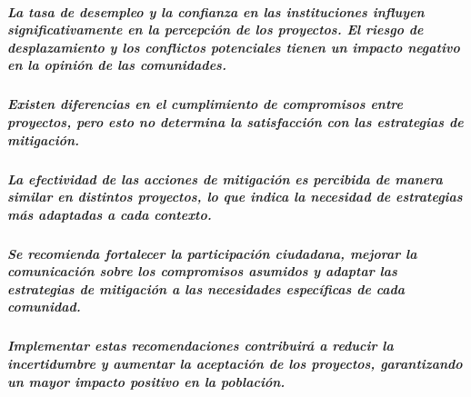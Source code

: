 \documentclass[
]{article}
\begin{document}
\subparagraph{\texorpdfstring{\emph{La tasa de desempleo y la confianza
en las instituciones influyen significativamente en la percepción de los
proyectos. El riesgo de desplazamiento y los conflictos potenciales
tienen un impacto negativo en la opinión de las
comunidades.}}{La tasa de desempleo y la confianza en las instituciones influyen significativamente en la percepción de los proyectos. El riesgo de desplazamiento y los conflictos potenciales tienen un impacto negativo en la opinión de las comunidades.}}\label{la-tasa-de-desempleo-y-la-confianza-en-las-instituciones-influyen-significativamente-en-la-percepciuxf3n-de-los-proyectos.-el-riesgo-de-desplazamiento-y-los-conflictos-potenciales-tienen-un-impacto-negativo-en-la-opiniuxf3n-de-las-comunidades.}

\subparagraph{\texorpdfstring{\emph{Existen diferencias en el
cumplimiento de compromisos entre proyectos, pero esto no determina la
satisfacción con las estrategias de
mitigación.}}{Existen diferencias en el cumplimiento de compromisos entre proyectos, pero esto no determina la satisfacción con las estrategias de mitigación.}}\label{existen-diferencias-en-el-cumplimiento-de-compromisos-entre-proyectos-pero-esto-no-determina-la-satisfacciuxf3n-con-las-estrategias-de-mitigaciuxf3n.}

\subparagraph{\texorpdfstring{\emph{La efectividad de las acciones de
mitigación es percibida de manera similar en distintos proyectos, lo que
indica la necesidad de estrategias más adaptadas a cada
contexto.}}{La efectividad de las acciones de mitigación es percibida de manera similar en distintos proyectos, lo que indica la necesidad de estrategias más adaptadas a cada contexto.}}\label{la-efectividad-de-las-acciones-de-mitigaciuxf3n-es-percibida-de-manera-similar-en-distintos-proyectos-lo-que-indica-la-necesidad-de-estrategias-muxe1s-adaptadas-a-cada-contexto.}

\subparagraph{\texorpdfstring{\emph{Se recomienda fortalecer la
participación ciudadana, mejorar la comunicación sobre los compromisos
asumidos y adaptar las estrategias de mitigación a las necesidades
específicas de cada
comunidad.}}{Se recomienda fortalecer la participación ciudadana, mejorar la comunicación sobre los compromisos asumidos y adaptar las estrategias de mitigación a las necesidades específicas de cada comunidad.}}\label{se-recomienda-fortalecer-la-participaciuxf3n-ciudadana-mejorar-la-comunicaciuxf3n-sobre-los-compromisos-asumidos-y-adaptar-las-estrategias-de-mitigaciuxf3n-a-las-necesidades-especuxedficas-de-cada-comunidad.}

\subparagraph{\texorpdfstring{\emph{Implementar estas recomendaciones
contribuirá a reducir la incertidumbre y aumentar la aceptación de los
proyectos, garantizando un mayor impacto positivo en la
población.}}{Implementar estas recomendaciones contribuirá a reducir la incertidumbre y aumentar la aceptación de los proyectos, garantizando un mayor impacto positivo en la población.}}\label{implementar-estas-recomendaciones-contribuiruxe1-a-reducir-la-incertidumbre-y-aumentar-la-aceptaciuxf3n-de-los-proyectos-garantizando-un-mayor-impacto-positivo-en-la-poblaciuxf3n.}
\end{document}
